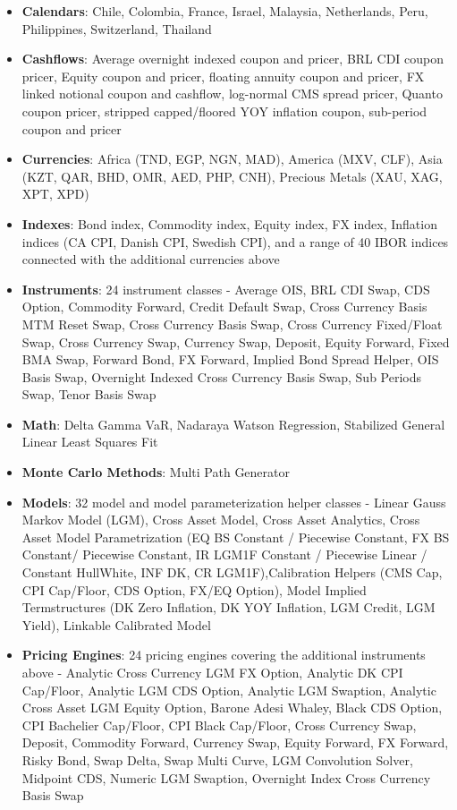 \documentclass[12pt, a4paper]{article}
\begin{document}
\begin{itemize}
\item {\bf Calendars}: Chile, Colombia, France, Israel, Malaysia, Netherlands, Peru, Philippines, Switzerland, Thailand
\item {\bf Cashflows}: Average overnight indexed coupon and pricer, BRL CDI coupon pricer, Equity coupon and pricer, floating annuity coupon and pricer, FX linked notional coupon and cashflow, log-normal CMS spread pricer, Quanto coupon pricer, stripped capped/floored YOY inflation coupon, sub-period coupon and pricer
\item {\bf Currencies}: Africa (TND, EGP, NGN, MAD), America (MXV, CLF), Asia (KZT, QAR, BHD, OMR, AED, PHP, CNH), Precious Metals (XAU, XAG, XPT, XPD)
\item {\bf Indexes}: Bond index, Commodity index, Equity index, FX index, Inflation indices (CA CPI, Danish CPI, Swedish CPI), and a range of 40 IBOR indices connected with the additional currencies above
\item {\bf Instruments}: 24 instrument classes - Average OIS, BRL CDI Swap, CDS Option, Commodity Forward, Credit Default Swap, Cross Currency Basis MTM Reset Swap, Cross Currency Basis Swap, Cross Currency Fixed/Float Swap, Cross Currency Swap, Currency Swap, Deposit, Equity Forward, Fixed BMA Swap, Forward Bond, FX Forward, Implied Bond Spread Helper, OIS Basis Swap, Overnight Indexed Cross Currency Basis Swap, Sub Periods Swap, Tenor Basis Swap
\item {\bf Math}: Delta Gamma VaR, Nadaraya Watson Regression, Stabilized General Linear Least Squares Fit
\item {\bf Monte Carlo Methods}: Multi Path Generator
\item {\bf Models}: 32 model and model parameterization helper classes - Linear Gauss Markov Model (LGM), Cross Asset Model, Cross Asset Analytics, Cross Asset Model Parametrization (EQ BS Constant / Piecewise Constant, FX BS Constant/ Piecewise Constant, IR LGM1F Constant / Piecewise Linear / Constant HullWhite, INF DK, CR LGM1F),Calibration Helpers (CMS Cap, CPI Cap/Floor, CDS Option, FX/EQ Option), Model Implied Termstructures (DK Zero Inflation, DK YOY Inflation, LGM Credit, LGM Yield), Linkable Calibrated Model
\item {\bf Pricing Engines}: 24 pricing engines covering the additional instruments above - Analytic Cross Currency LGM FX Option, Analytic DK CPI Cap/Floor, Analytic LGM CDS Option, Analytic LGM Swaption, Analytic Cross Asset LGM Equity Option, Barone Adesi Whaley, Black CDS Option, CPI Bachelier Cap/Floor, CPI Black Cap/Floor, Cross Currency Swap, Deposit, Commodity Forward, Currency Swap, Equity Forward, FX Forward, Risky Bond, Swap Delta, Swap Multi Curve, LGM Convolution Solver, Midpoint CDS, Numeric LGM Swaption, Overnight Index Cross Currency Basis Swap

\end{itemize}
\end{document}
